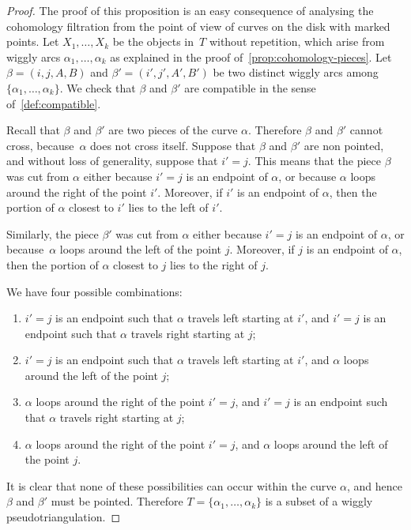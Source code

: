 \documentclass{amsart}
\theoremstyle{definition}
\begin{document}
\begin{proof}
  The proof of this proposition is an easy consequence of analysing the cohomology filtration from the point of view of curves on the disk with marked points.
  Let \(X_1, \ldots, X_k\) be the objects in~\(T\) without repetition, which arise from wiggly arcs \(\alpha_1, \ldots, \alpha_k\) as explained in the proof of~\cref{prop:cohomology-pieces}.
  Let \(\beta = (i,j,A,B)\) and \(\beta' = (i',j', A',B')\) be two distinct wiggly arcs among~\(\{\alpha_1, \ldots,\alpha_k\}\).
  We check that \(\beta\) and \(\beta'\) are compatible in the sense of~\cref{def:compatible}.
  
  Recall that \(\beta\) and \(\beta'\) are two pieces of the curve \(\alpha\).
  Therefore \(\beta\) and \(\beta'\) cannot cross, because~\(\alpha\) does not cross itself.
  Suppose that \(\beta\) and \(\beta'\) are non pointed, and without loss of generality, suppose that \(i' = j\).
  This means that the piece \(\beta\) was cut from \(\alpha\) either because \(i' = j\) is an endpoint of \(\alpha\), or because \(\alpha\) loops around the right of the point \(i'\).
  Moreover, if \(i'\) is an endpoint of \(\alpha\), then the portion of \(\alpha\) closest to \(i'\) lies to the left of \(i'\).
  
  Similarly, the piece \(\beta'\) was cut from \(\alpha\) either because \(i' = j\) is an endpoint of \(\alpha\), or because~\(\alpha\) loops around the left of the point \(j\).
  Moreover, if \(j\) is an endpoint of \(\alpha\), then the portion of \(\alpha\) closest to \(j\) lies to the right of \(j\).

  We have four possible combinations:
  \begin{enumerate}
  \item \(i' = j\) is an endpoint such that \(\alpha\) travels left starting at \(i'\), and \(i' = j\) is an endpoint such that \(\alpha\) travels right starting at \(j\);
  \item \(i' = j\) is an endpoint such that \(\alpha\) travels left starting at \(i'\), and \(\alpha\) loops around the left of the point \(j\);
  \item \(\alpha\) loops around the right of the point \(i' = j\), and \(i' = j\) is an endpoint such that \(\alpha\) travels right starting at \(j\); 
  \item \(\alpha\) loops around the right of the point \(i' = j\), and \(\alpha\) loops around the left of the point \(j\).
  \end{enumerate}
  It is clear that none of these possibilities can occur within the curve \(\alpha\), and hence \(\beta\) and \(\beta'\) must be pointed.
  Therefore \(T = \{\alpha_1, \ldots, \alpha_k\}\) is a subset of a wiggly pseudotriangulation.


\end{proof}
\end{document}

